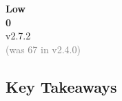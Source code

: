 \documentclass{article}
\begin{document}
\begin{minipage}[t]{0.24\textwidth}
    \colorbox{SeverityLow!20}{%
        \begin{minipage}{\linewidth}
            \centering
            \vspace{0.3cm}
            {\large \textbf{Low}}\\[0.2cm]
            {\Huge \textcolor{SeverityLow}{\textbf{0}}}\\[0.1cm]
            {\small v2.7.2}\\[0.1cm]
            {\footnotesize \textcolor{gray}{(was 67 in v2.4.0)}}\\
            \vspace{0.3cm}
        \end{minipage}
    }
\end{minipage}

\vspace{0.5cm}

\subsection{Key Takeaways}
\end{document}
